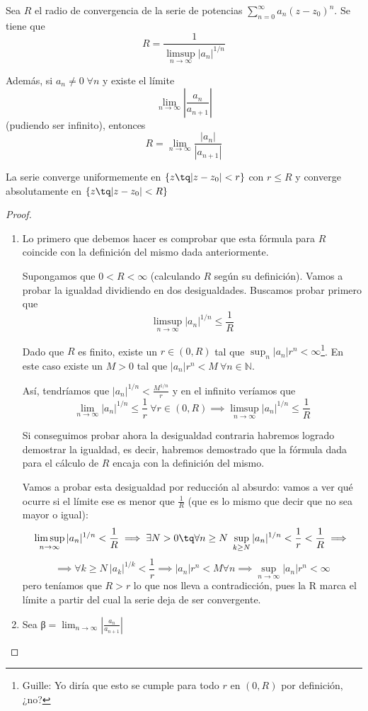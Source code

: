 \documentclass{apuntes}
\begin{document}
\begin{theorem}
Sea $R$ el radio de convergencia de la serie de potencias $\sum_{n=0}^{\infty} a_n (z-z_0)^n$. Se tiene que \[R = \frac{1}{\limsup_{n \to \infty} |a_n|^{1/n}}\]

Además, si $a_n \neq 0\; \forall n$ y existe el límite \[ \lim_{n \to \infty} \left|\frac{a_n}{a_{n+1}}\right|\] (pudiendo ser infinito), entonces \[ R = \lim_{n \to \infty}\frac{|a_n|}{|a_{n+1}|}\]

La serie converge uniformemente en $\{z \tq |z-z_0| < r\}$ con $r \leq R$ y converge absolutamente en $\{z \tq |z-z_0|<R\}$
\end{theorem}
\begin{proof}

\begin{enumerate}
\item Lo primero que debemos hacer es comprobar que esta fórmula para $R$ coincide con la definición del mismo dada anteriormente.

Supongamos que $0<R<\infty$ (calculando $R$ según su definición). Vamos a probar la igualdad dividiendo en dos desigualdades. Buscamos probar primero que
\[\limsup_{n \to \infty} |a_n|^{1/n} \leq \frac{1}{R}\]

Dado que $R$ es finito, existe un $r∈(0,R)$ tal que $\sup_n |a_n| r^n <\infty$\footnote{Guille: Yo diría que esto se cumple para todo $r$ en $(0,R)$ por definición, ¿no?}. En este caso existe un $M>0$ tal que $|a_n|r^n < M \ \forall n ∈ ℕ$.

Así, tendríamos que $|a_n|^{1/n} < \frac{M^{1/n}}{r}$ y en el infinito veríamos que
\[\lim_{n \to \infty} |a_n|^{1/n} \leq \frac{1}{r} \ \forall r ∈ (0,R) \implies \limsup_{n \to \infty}|a_n|^{1/n} \leq \frac{1}{R}\]

Si conseguimos probar ahora la desigualdad contraria habremos logrado demostrar la igualdad, es decir, habremos demostrado que la fórmula dada para el cálculo de $R$ encaja con la definición del mismo.

Vamos a probar esta desigualdad por reducción al absurdo: vamos a ver qué ocurre si el límite ese es menor que $\frac{1}{R}$ (que es lo mismo que decir que no sea mayor o igual):
\[\limsup_{n \to \infty}|a_n|^{1/n} < \frac{1}{R} \implies \exists N > 0 \tq \forall n \geq N \ \sup_{k \geq N} |a_n|^{1/n} < \frac{1}{r} < \frac{1}{R} \implies\]
\[\implies \forall k \geq N \ |a_k|^{1/k} < \frac{1}{r} \implies |a_n| r^n < M \forall n \implies \sup_{n\to\infty}|a_n|r^n< \infty\]
pero teníamos que $R > r$ lo que nos lleva a contradicción, pues la R marca el límite a partir del cual la serie deja de ser convergente.
\item
Sea β$= \lim_{n \to \infty}\left|\frac{a_n}{a_{n+1}} \right|$


\end{enumerate}
\end{proof}
\end{document}

